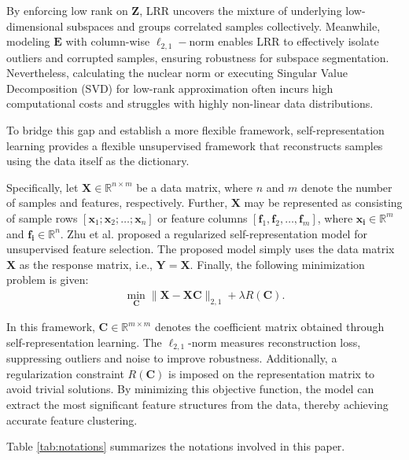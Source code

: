 \documentclass[ASNA,twocolumn]{USG} %
\begin{document}
By enforcing low rank on $\boldsymbol{Z}$, LRR uncovers the mixture of underlying low-dimensional subspaces and groups correlated samples collectively. Meanwhile, modeling $\boldsymbol{E}$ with column-wise $\ell_{2,1}-$norm enables LRR to effectively isolate outliers and corrupted samples, ensuring robustness for subspace segmentation.
Nevertheless, calculating the nuclear norm or executing Singular Value Decomposition (SVD) for low-rank approximation often incurs high computational costs and struggles with highly non-linear data distributions.

To bridge this gap and establish a more flexible framework, self-representation learning provides a flexible unsupervised framework that reconstructs samples using the data itself as the dictionary.

Specifically, let $\boldsymbol{X}\in \mathbb{R}^{n\times m}$ be a data matrix, where $n$ and $m$ denote the number of samples and features, respectively. Further, $\boldsymbol{X}$ may be represented as consisting of sample rows $[\boldsymbol{x}_1;\boldsymbol{x}_2;\dots;\boldsymbol{x}_n]$ or feature columns $[\boldsymbol{f}_1,\boldsymbol{f}_2,\dots,\boldsymbol{f}_m]$, where $\boldsymbol{x_i}\in \mathbb{R}^m$ and $\boldsymbol{f_i}\in \mathbb{R}^n$. Zhu et al. \cite{zhu2015unsupervised} proposed a regularized self-representation model for unsupervised feature selection. The proposed model simply uses the data matrix $\boldsymbol{X}$ as the response matrix, i.e., $ \boldsymbol{Y} = \boldsymbol{X} $. Finally, the following minimization problem is given:
\begin{eqnarray}
	\min_{\boldsymbol{C}}\|\boldsymbol{X}-\boldsymbol{X}\boldsymbol{C}\|_{2,1}+\lambda R(\boldsymbol{C}).
\end{eqnarray}

In this framework, $\boldsymbol{C} \in \mathbb{R}^{m \times m}$ denotes the coefficient matrix obtained through self-representation learning. The $\ell_{2,1}$-norm measures reconstruction loss, suppressing outliers and noise to improve robustness. Additionally, a regularization constraint $R(\boldsymbol{C})$ is imposed on the representation matrix to avoid trivial solutions. By minimizing this objective function, the model can extract the most significant feature structures from the data, thereby achieving accurate feature clustering.

Table \ref{tab:notations} summarizes the notations involved in this paper.
\end{document}

